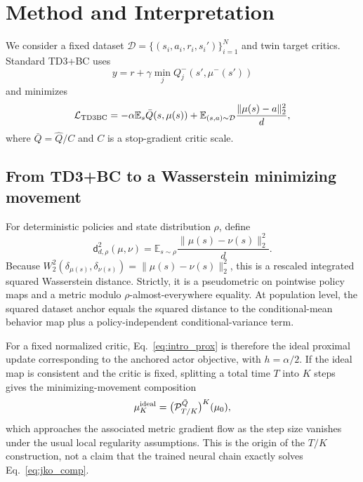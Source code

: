 \documentclass[twoside]{article}
\newcommand{\E}{\mathbb E}
\newcommand{\D}{\mathcal D}
\begin{document}
\section{Method and Interpretation}
We consider a fixed dataset $\D=\{(s_i,a_i,r_i,s_i')\}_{i=1}^N$ and twin target critics. Standard TD3+BC uses
\begin{equation}
y=r+\gamma\min_jQ_j^-(s',\mu^-(s'))
\end{equation}
and minimizes
\begin{equation}
\mathcal L_{\rm TD3BC}=-\alpha\E_s\bar Q(s,\mu(s))+\E_{(s,a)\sim\D}\frac{\|\mu(s)-a\|_2^2}{d},
\end{equation}
where $\bar Q=\widehat Q/C$ and $C$ is a stop-gradient critic scale.

\subsection{From TD3+BC to a Wasserstein minimizing movement}
For deterministic policies and state distribution $\rho$, define
\begin{equation}
\mathsf d_{d,\rho}^2(\mu,\nu)=\E_{s\sim\rho}\frac{\|\mu(s)-\nu(s)\|_2^2}{d}.
\label{eq:metric}
\end{equation}
Because $W_2^2(\delta_{\mu(s)},\delta_{\nu(s)})=\|\mu(s)-\nu(s)\|_2^2$, this is a rescaled integrated squared Wasserstein distance. Strictly, it is a pseudometric on pointwise policy maps and a metric modulo $\rho$-almost-everywhere equality. At population level, the squared dataset anchor equals the squared distance to the conditional-mean behavior map plus a policy-independent conditional-variance term.

For a fixed normalized critic, Eq.~\eqref{eq:intro_prox} is therefore the ideal proximal update corresponding to the anchored actor objective, with $h=\alpha/2$. If the ideal map is consistent and the critic is fixed, splitting a total time $T$ into $K$ steps gives the minimizing-movement composition
\begin{equation}
\mu_K^{\rm ideal}=\bigl(\mathcal P_{T/K}^{\bar Q}\bigr)^K(\mu_0),
\label{eq:jko_comp}
\end{equation}
which approaches the associated metric gradient flow as the step size vanishes under the usual local regularity assumptions. This is the origin of the $T/K$ construction, not a claim that the trained neural chain exactly solves Eq.~\eqref{eq:jko_comp}.
\end{document}

